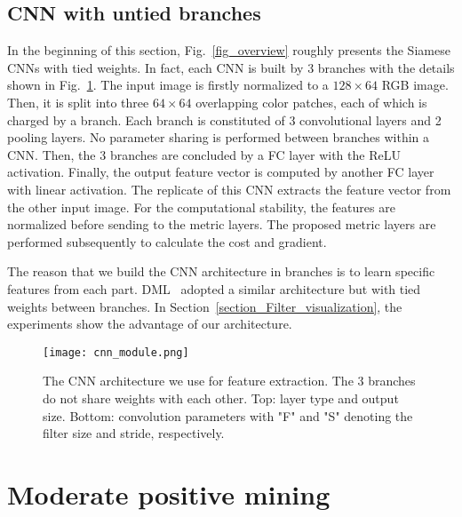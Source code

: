 \documentclass[10pt,twocolumn,letterpaper]{article}
\begin{document}
\subsection{CNN with untied branches}
\label{section_CNN_architecture_details}

In the beginning of this section, Fig.~\ref{fig_overview} roughly presents the Siamese CNNs with tied weights.
In fact, each CNN is built by 3 branches with the details shown in Fig.~\ref{cnn-module}.
The input image is firstly normalized to a $128\times64$ RGB image. Then, it is split into three $64\times64$ overlapping color patches, each of which is charged by a branch. Each branch is constituted of 3 convolutional layers and 2 pooling layers. No parameter sharing is performed between branches within a CNN. Then, the 3 branches are concluded by a FC layer with the ReLU activation. Finally, the output feature vector is computed by another FC layer with linear activation.
The replicate of this CNN extracts the feature vector from the other input image.
For the computational stability, the features are normalized before sending to the metric layers.
The proposed metric layers are performed subsequently to calculate the cost and gradient.


The reason that we build the CNN architecture in branches is to learn specific features from each part.
DML~\cite{yi2014deep} adopted a similar architecture but with tied weights between branches.
In Section~\ref{section_Filter_visualization}, the experiments show the advantage of our architecture.

\begin{figure}[!htb]
  \centering
  \texttt{[image: cnn\_module.png]}
  \caption{The CNN architecture we use for feature extraction. The 3 branches do not share weights with each other.
  Top: layer type and output size. Bottom: convolution parameters with "F" and "S" denoting the filter size and stride, respectively.}
  \label{cnn-module}
\end{figure}








\section{Moderate positive mining}
\label{section_Moderate_positive_mining}
\end{document}
